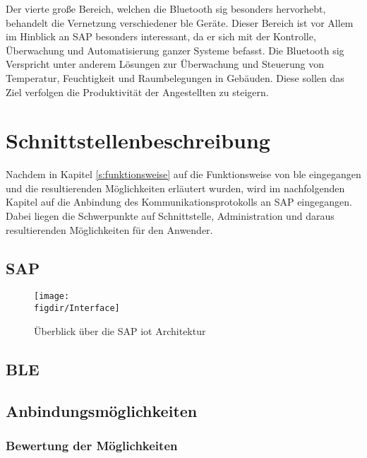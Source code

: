 \noindent Der vierte große Bereich, welchen die Bluetooth \ac{sig} besonders hervorhebt, behandelt die Vernetzung verschiedener \ac{ble} Geräte. Dieser Bereich ist vor Allem im Hinblick an SAP besonders interessant, da er sich mit der Kontrolle, Überwachung und Automatisierung ganzer Systeme befasst. Die Bluetooth \ac{sig} Verspricht unter anderem Lösungen zur Überwachung und Steuerung von Temperatur, Feuchtigkeit und Raumbelegungen in Gebäuden. Diese sollen das Ziel verfolgen die Produktivität der Angestellten zu steigern.\\   

\section{Schnittstellenbeschreibung}
\label{s:interface} 

\noindent Nachdem in Kapitel \ref{s:funktionsweise} auf die Funktionsweise von \ac{ble} eingegangen und die resultierenden Möglichkeiten erläutert wurden, wird im nachfolgenden Kapitel auf die Anbindung des Kommunikationsprotokolls an SAP eingegangen. Dabei liegen die Schwerpunkte auf Schnittstelle, Administration und daraus resultierenden Möglichkeiten für den Anwender.\\

\subsection{SAP}
\label{ss:interface:sap}

\begin{figure}[!b]
	\centering
	\texttt{[image: \\figdir/Interface]}
	\caption{Überblick über die SAP \ac{iot} Architektur \cite[Seiten 117, 164, 181, 184, 201, 208, 221]{Holtschulte20:IOS}}
	\label{FIG:Interface}
\end{figure}

\subsection{BLE}
\label{ss:interface:ble}

\subsection{Anbindungsmöglichkeiten}
\label{ss:interface:connect}

\subsubsection{Bewertung der Möglichkeiten}
\label{sss:interface:connect:eval}

